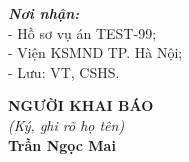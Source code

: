 \documentclass[12pt,a4paper]{article}
\begin{document}
\vspace{0.8cm}

\noindent
\begin{minipage}[t]{0.45\textwidth}
    \small
    \textbf{\textit{Nơi nhận:}}\\
    - Hồ sơ vụ án TEST-99;\\
    - Viện KSMND TP. Hà Nội;\\
    - Lưu: VT, CSHS.
\end{minipage}
\hfill
\begin{minipage}[t]{0.5\textwidth}
    \begin{center}
        \small
        \textbf{NGƯỜI KHAI BÁO}\\
        \textit{(Ký, ghi rõ họ tên)}\\[1.5cm]
        \textbf{Trần Ngọc Mai}
    \end{center}
\end{minipage}
\end{document}
